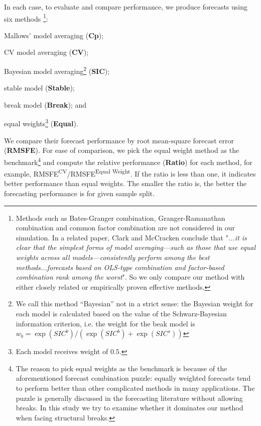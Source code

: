 In each case, to evaluate and compare performance, we produce forecasts using six methods \footnote{Methods such as Bates-Granger combination, Granger-Ramanathan combination and common factor combination are not considered in our simulation. In a related paper, Clark and McCracken \cite{clark_mccracken_averagingVAR_2008} conclude that "\emph{...it is clear that the simplest forms of model averaging---such as those that use equal weights across all models---consistently perform among the best methods...forecasts based on OLS-type combination and factor-based combination rank among the worst}". So we only compare our method with either closely related or empirically proven effective methods.}:
\begin{inparaenum}[(i)]
\item Mallows' model averaging (\textbf{Cp});
\item CV model averaging (\textbf{CV});
\item Bayesian model averaging\footnote{We call this method ``Bayesian'' not in a strict sense: the Bayesian weight for each model is calculated based on the value of the Schwarz-Bayesian information criterion, i.e. the weight for the beak model is $w_{b} = \exp{(SIC^{b})}/(\exp{(SIC^{b})} + \exp{(SIC^{s})})$} (\textbf{SIC});
\item stable model (\textbf{Stable});
\item break model (\textbf{Break}); and
\item equal weights\footnote{Each model receives weight of $0.5$.} (\textbf{Equal}).
\end{inparaenum}
We compare their forecast performance by root mean-square forecast error (\textbf{RMSFE}). For ease of comparison, we pick the equal weight method as the benchmark\footnote{The reason to pick equal weights as the benchmark is because of the aforementioned forecast combination puzzle: equally weighted forecasts tend to perform better than other complicated methods in many applications. The puzzle is generally discussed in the forecasting literature without allowing breaks. In this study we try to examine whether it dominates our method when facing structural breaks.} and compute the relative performance (\textbf{Ratio}) for each method, for example, RMSFE\textsuperscript{CV}/RMSFE\textsuperscript{Equal Weight}. If the ratio is less than one, it indicates better performance than equal weights. The smaller the ratio is, the better the forecasting performance is for given sample split.
